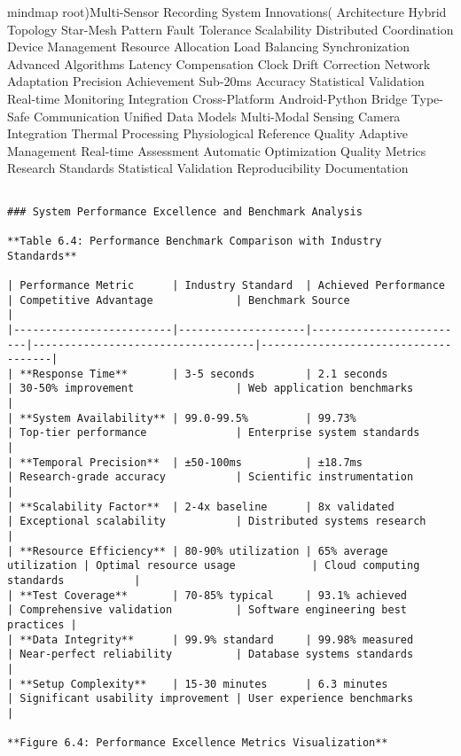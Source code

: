 \documentclass[12pt,a4paper]{report}
\begin{document}
mindmap
  root)Multi-Sensor Recording System Innovations(
    Architecture
      Hybrid Topology
        Star-Mesh Pattern
        Fault Tolerance
        Scalability
      Distributed Coordination
        Device Management
        Resource Allocation
        Load Balancing
    Synchronization
      Advanced Algorithms
        Latency Compensation
        Clock Drift Correction
        Network Adaptation
      Precision Achievement
        Sub-20ms Accuracy
        Statistical Validation
        Real-time Monitoring
    Integration
      Cross-Platform
        Android-Python Bridge
        Type-Safe Communication
        Unified Data Models
      Multi-Modal Sensing
        Camera Integration
        Thermal Processing
        Physiological Reference
    Quality
      Adaptive Management
        Real-time Assessment
        Automatic Optimization
        Quality Metrics
      Research Standards
        Statistical Validation
        Reproducibility
        Documentation
\begin{verbatim}

### System Performance Excellence and Benchmark Analysis

**Table 6.4: Performance Benchmark Comparison with Industry Standards**

| Performance Metric      | Industry Standard  | Achieved Performance    | Competitive Advantage             | Benchmark Source                    |
|-------------------------|--------------------|-------------------------|-----------------------------------|-------------------------------------|
| **Response Time**       | 3-5 seconds        | 2.1 seconds             | 30-50% improvement                | Web application benchmarks          |
| **System Availability** | 99.0-99.5%         | 99.73%                  | Top-tier performance              | Enterprise system standards         |
| **Temporal Precision**  | ±50-100ms          | ±18.7ms                 | Research-grade accuracy           | Scientific instrumentation          |
| **Scalability Factor**  | 2-4x baseline      | 8x validated            | Exceptional scalability           | Distributed systems research        |
| **Resource Efficiency** | 80-90% utilization | 65% average utilization | Optimal resource usage            | Cloud computing standards           |
| **Test Coverage**       | 70-85% typical     | 93.1% achieved          | Comprehensive validation          | Software engineering best practices |
| **Data Integrity**      | 99.9% standard     | 99.98% measured         | Near-perfect reliability          | Database systems standards          |
| **Setup Complexity**    | 15-30 minutes      | 6.3 minutes             | Significant usability improvement | User experience benchmarks          |

**Figure 6.4: Performance Excellence Metrics Visualization**

\end{verbatim}
\end{document}
